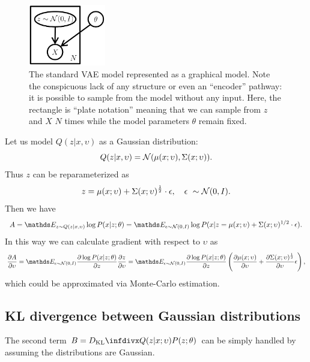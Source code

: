 \documentclass{article}
\begin{document}
\begin{figure}
\centering
\includegraphics[width=0.3\textwidth]{figures/graphical_model.pdf}
\caption{\small 
The standard VAE model represented as a graphical model.  
Note the conspicuous lack of any structure or even an ``encoder'' pathway: it is possible to sample from the model without any input.
Here, the rectangle is ``plate notation'' meaning that we can sample from $z$ and $X$ $N$ times while the model parameters $\theta$ remain fixed.}
\label{fig:vae}
\end{figure}

Let us model $Q(z|x, \upsilon)$ as a Gaussian distribution:
\begin{equation}
    Q(z|x,\upsilon) = \mathcal{N}(\mu(x;\upsilon),\Sigma(x;\upsilon)).
\end{equation}
Thus $z$ can be reparameterized as
\begin{equation}
    z = \mu(x;\upsilon) + \Sigma(x;\upsilon)^{\frac{1}{2}} \cdot \epsilon,\quad \epsilon~\sim \mathcal{N}(0,I).
\end{equation}
Then we have
\begin{equation}
    A = \Ebb_{z\sim Q(z|x,\upsilon)}\log P(x|z;\theta) = \Ebb_{\epsilon\sim\Ncal(0,I)}\log P(x|z= \mu(x;\upsilon)+\Sigma(x;\upsilon)^{1/2} \cdot \epsilon).
\end{equation}
In this way we can calculate gradient with respect to $\upsilon$ as
\begin{equation}
    \pd{A}{\upsilon} = \Ebb_{\epsilon\sim\Ncal(0,I)}\pd{\log P(x|z;\theta)}{z} \pd{z}{\upsilon} = \Ebb_{\epsilon\sim\Ncal(0,I)}\pd{\log P(x|z;\theta)}{z} \left( \pd{\mu(x;\upsilon)}{\upsilon} + \pd{\Sigma(x;\upsilon)^{\half}}{\upsilon}\epsilon \right),
\end{equation}
which could be approximated via Monte-Carlo estimation.


\subsection{KL divergence between Gaussian distributions}
The second term $B = \kld{Q(z|x;\upsilon)}{P(z; \theta)}$ can be simply handled by assuming the distributions are Gaussian.
\end{document}
